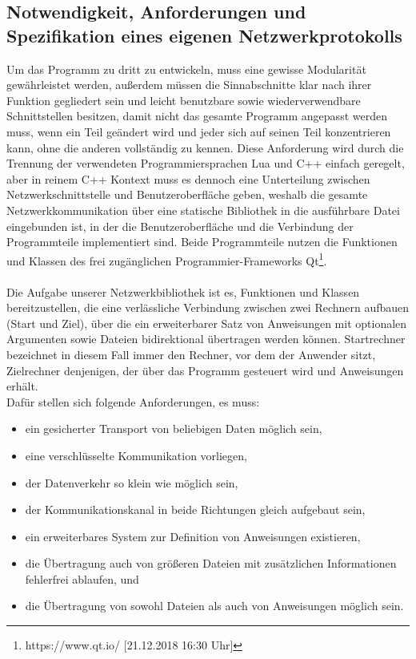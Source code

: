 \subsection{Notwendigkeit, Anforderungen und Spezifikation eines eigenen Netzwerkprotokolls}
Um das Programm zu dritt zu entwickeln, muss eine gewisse Modularität gewährleistet werden, außerdem müssen die Sinnabschnitte klar nach ihrer Funktion gegliedert sein und leicht benutzbare sowie wiederverwendbare Schnittstellen besitzen, damit nicht das gesamte Programm angepasst werden muss, wenn ein Teil geändert wird und jeder sich auf seinen Teil konzentrieren kann, ohne die anderen vollständig zu kennen.
Diese Anforderung wird durch die Trennung der verwendeten Programmiersprachen Lua und C++ einfach geregelt, aber in reinem C++ Kontext muss es dennoch eine Unterteilung zwischen Netzwerkschnittstelle und Benutzeroberfläche geben, weshalb die gesamte Netzwerkkommunikation über eine statische Bibliothek in die ausführbare Datei eingebunden ist, in der die Benutzeroberfläche und die Verbindung der Programmteile implementiert sind. Beide Programmteile nutzen die Funktionen und Klassen des frei zugänglichen Programmier-Frameworks Qt\footnote{https://www.qt.io/ [21.12.2018 16:30 Uhr]}.\\\\
Die Aufgabe unserer Netzwerkbibliothek ist es, Funktionen und Klassen bereitzustellen, die eine verlässliche Verbindung zwischen zwei Rechnern aufbauen (Start und Ziel), über die ein erweiterbarer Satz von Anweisungen mit optionalen Argumenten sowie Dateien bidirektional übertragen werden können.
Startrechner bezeichnet in diesem Fall immer den Rechner, vor dem der Anwender sitzt, Zielrechner denjenigen, der über das Programm gesteuert wird und Anweisungen erhält.\\
Dafür stellen sich folgende Anforderungen, es muss:\\

\begin{itemize}
\item ein gesicherter Transport von beliebigen Daten möglich sein,
\item eine verschlüsselte Kommunikation vorliegen,
\item der Datenverkehr so klein wie möglich sein,
\item der Kommunikationskanal in beide Richtungen gleich aufgebaut sein,
\item ein erweiterbares System zur Definition von Anweisungen existieren,
\item die Übertragung auch von größeren Dateien mit zusätzlichen Informationen fehlerfrei ablaufen, und
\item die Übertragung von sowohl Dateien als auch von Anweisungen möglich sein.

\end{itemize}

